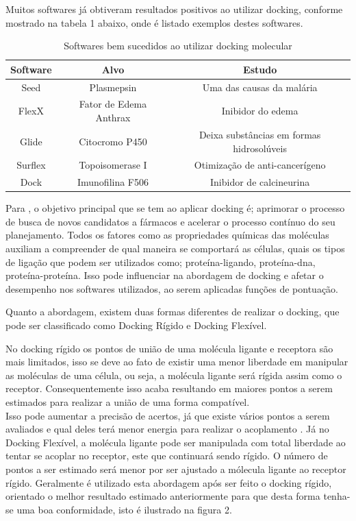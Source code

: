 \documentclass[tcc, capa]{texucpel}
\begin{document}
Muitos softwares já obtiveram resultados positivos ao utilizar docking, conforme mostrado na tabela 1 abaixo, onde é listado exemplos destes softwares.
\begin{table}[h]
\centering
\caption{Softwares bem sucedidos ao utilizar docking molecular \cite{sliwoski2014computational} }

\begin{tabular}{@{}|c|c|c|@{}}
\toprule

Software & Alvo                   & Estudo                                                   \\ \midrule
Seed     & Plasmepsin             & Uma das causas da malária                                \\ \midrule
FlexX    & Fator de Edema Anthrax & Inibidor do edema                                        \\ \midrule
Glide    & Citocromo P450         & Deixa substâncias em formas hidrosolúveis         \\ \midrule
Surflex  & Topoisomerase I        & Otimização de anti-cancerígeno                           \\ \midrule
Dock     & Imunofilina F506       & Inibidor de calcineurina \\ \bottomrule
\end{tabular}
\end{table}

Para \cite{rodrigues2012estrategias}, o objetivo principal que se tem ao aplicar docking é; aprimorar o processo de busca de novos candidatos a fármacos e acelerar o processo contínuo do seu planejamento. 
Todos os fatores como as propriedades químicas das moléculas auxiliam a compreender de qual maneira se comportará as células, quais os tipos de ligação que podem ser utilizados como; proteína-ligando, proteína-dna, proteína-proteína. Isso pode influenciar na abordagem de docking e afetar o desempenho nos softwares utilizados, ao serem aplicadas funções de pontuação.

Quanto a abordagem, existem duas formas diferentes de realizar o docking, que pode ser classificado como Docking Rígido e Docking Flexível.

No docking rígido os pontos de união de uma molécula ligante e receptora são mais limitados, isso se deve ao fato de existir uma menor liberdade em manipular as moléculas de uma célula, ou seja, a molécula ligante será rígida assim como o receptor. Consequentemente isso acaba resultando em maiores pontos a serem estimados para realizar a união de uma forma compatível. \\
Isso pode aumentar a precisão de acertos, já que existe vários pontos a serem avaliados e qual deles terá menor energia para realizar o acoplamento \cite{pagadala2017software}. 
Já no Docking Flexível, a molécula ligante pode ser manipulada com total liberdade ao tentar se acoplar no receptor,  este que continuará sendo rígido. O número de pontos a ser estimado será menor por ser ajustado a mólecula ligante ao receptor rígido.
Geralmente é utilizado esta abordagem após ser feito o docking rígido, orientado o melhor resultado estimado anteriormente para que desta forma tenha-se uma boa conformidade, isto é ilustrado na figura 2.
\end{document}
